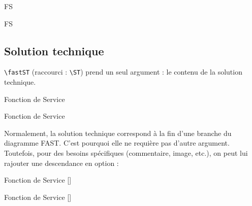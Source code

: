 \begin{code}
\begin{fast}{FS}
		{
		}
\end{fast}
\end{code}
		\cqd
\begin{exemple}
\begin{fast}{FS}
\end{fast}
\end{exemple}



	\subsection{Solution technique }\label{ST}

		{\color{blue}\verb'\fastST'} (raccourci : {\color{blue}\verb'\ST'}) prend un seul argument : le contenu de la solution technique.

\begin{code}
\begin{fast}{Fonction de Service}
\end{fast}
\end{code}
		\cqd
\begin{exemple}
\begin{fast}{Fonction de Service}
\end{fast}
\end{exemple}

		Normalement, la solution technique correspond à la fin d'une branche du diagramme FAST.
		C'est pourquoi elle ne requière pas d'autre argument.
		Toutefois, pour des besoins spécifiques (commentaire, image, etc.), on peut lui rajouter une descendance en option :

\begin{code}
\begin{fast}{Fonction de Service}
	[]
\end{fast}
\end{code}
		\cqd
\begin{exemple}
\begin{fast}{Fonction de Service}
	[]
\end{fast}
\end{exemple}


